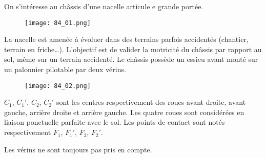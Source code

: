 \normaltrue \difficilefalse \tdifficilefalse
\correctionfalse

\setcounter{question}{0}


\ifcorrection
\else
{}
\fi


\ifprof
\else
On s'intéresse au châssis d'une nacelle articule e grande portée.

\begin{figure}[H]
\centering
\texttt{[image: 84\_01.png]}
\end{figure} 

La nacelle est amenée à évoluer dans des terrains parfois accidentés (chantier, terrain en friche…).
L’objectif est de valider la motricité du châssis par rapport au sol, même sur un terrain accidenté. 
Le châssis possède un essieu avant monté sur un palonnier pilotable par deux vérins.


\begin{figure}[H]
\centering
\texttt{[image: 84\_02.png]}
\end{figure} 


$C_1$, $C_1'$, $C_2$, $C_2'$ sont les centres respectivement des roues avant droite, avant gauche, arrière droite 
et arrière gauche. Les quatre roues sont considérées en liaison ponctuelle parfaite avec le sol. Les 
points de contact sont notés respectivement $F_1$, $F_1'$, $F_2$, $F_2'$.

\fi





Les vérins ne sont toujours pas pris en compte. 

